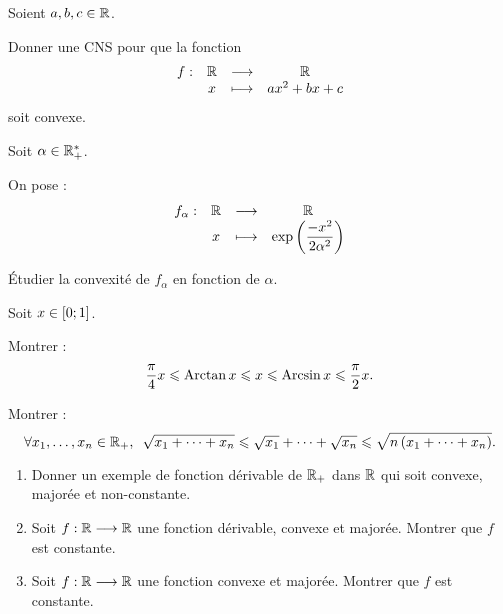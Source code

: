 \begin{exo}
Soient \(a,b,c\in\mathbb{R}\).

Donner une CNS pour que la fonction \[\begin{array}[t]{cccc}f : & \mathbb{R} & \longrightarrow & \mathbb{R} \\ & x & \longmapsto & ax^2+bx+c\end{array}\] soit convexe.
\end{exo}

\begin{corr}
\end{corr}

\begin{exo}
Soit \(\alpha\in\mathbb{R}_+^*\).

On pose : \[\begin{array}[t]{cccc}f_\alpha : & \mathbb{R} & \longrightarrow & \mathbb{R} \\ & x & \longmapsto & \exp\left(\dfrac{-x^2}{2\alpha^2}\right)\end{array}\]

Étudier la convexité de \(f_\alpha\) en fonction de \(\alpha\).
\end{exo}

\begin{corr}
\end{corr}

\begin{exo}
Soit \(x\in\left[0;1\right]\).

Montrer : \[\dfrac{\pi}{4}x\leqslant\operatorname{Arctan} x\leqslant x\leqslant\operatorname{Arcsin} x\leqslant\dfrac{\pi}{2}x.\]
\end{exo}

\begin{corr}
\end{corr}

\begin{exo}
Montrer : \[\quantifs{\forall x_1,\dots,x_n\in\Rp}\sqrt{x_1+\dots+x_n}\leq\sqrt{x_1}+\dots+\sqrt{x_n}\leq\sqrt{n\paren{x_1+\dots+x_n}}.\]
\end{exo}

\begin{corr}
\end{corr}

\begin{exo}
\begin{enumerate}
\item Donner un exemple de fonction dérivable de \(\mathbb{R}_+\) dans \(\mathbb{R}\) qui soit convexe, majorée et non-constante. \\

\item Soit \(f:\mathbb{R}\longrightarrow\mathbb{R}\) une fonction dérivable, convexe et majorée. Montrer que \(f\) est constante. \\

\item Soit \(f:\mathbb{R}\longrightarrow\mathbb{R}\) une fonction convexe et majorée. Montrer que \(f\) est constante.
\end{enumerate}
\end{exo}

